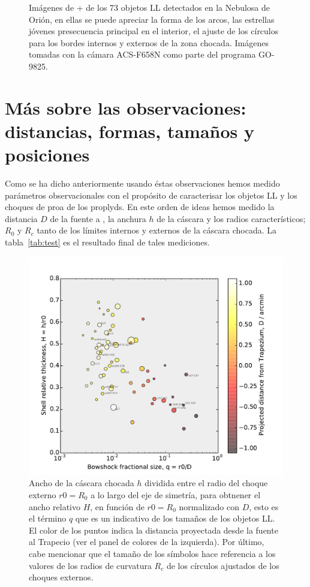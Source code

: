 \begin{figure}[htp]
\begin{tabular}{|l|l|}
\end{tabular}
  \caption{Imágenes de \ha{}+\nii{} de los 73 objetos LL detectados en la Nebulosa de Orión, en ellas se puede apreciar la forma de los arcos, las estrellas jóvenes presecuencia principal en el interior, el ajuste de los círculos para los bordes internos y externos de la zona chocada. Imágenes tomadas con la cámara ACS-F658N como parte del programa GO-9825. }
  \label{fig:images} 
\end{figure}

\section{Más sobre las observaciones: distancias, formas, tamaños y posiciones}
\label{sec:observations}

Como se ha dicho anteriormente usando éstas observaciones  hemos medido parámetros observacionales con el propósito de caracterisar los objetos LL y los choques de proa de los proplyds. En este orden de ideas hemos medido la distancia \(D\) de la fuente a \thC{}, la anchura \(h\) de la cáscara y los radios característicos; \(R_{0}\) y \(R_{c}\) tanto de los límites internos y externos de la cáscara chocada. La tabla~\ref{tab:test} es el resultado final de tales mediciones.\\

\begin{figure}
  \centering
  \includegraphics[width=\linewidth]{luis-programas/will-H-vs-q}
  \caption{Ancho de la cáscara chocada \(h\) dividida entre el radio del choque externo \(r0 = R_{0}\) a lo largo del eje de simetría, para obtnener el ancho relativo \(H\), en función de  \(r0 = R_{0}\) normalizado con \(D\), esto es el término \(q\) que es un indicativo de los tamaños de los objetos LL. El color de los puntos indica la distancia proyectada desde la fuente al Trapecio (ver el panel de colores de la izquierda). Por último, cabe mencionar que el tamaño de los símbolos hace referencia a los valores de los radios de curvatura \(R_{c}\) de los círculos ajustados de los choques externos.}
  \label{fig:thikness}
\end{figure} 

